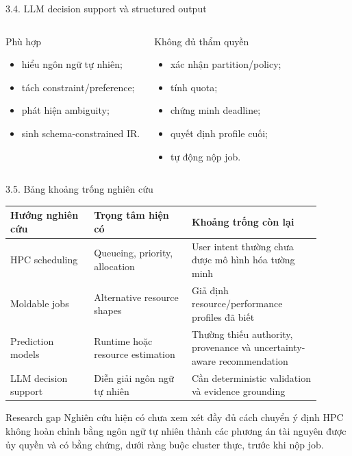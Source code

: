 \begin{frame}[t]{3.4. LLM decision support và structured output}
\small
\begin{columns}[T]
\begin{exampleblock}{Phù hợp}
\begin{itemize}
  \item hiểu ngôn ngữ tự nhiên;
  \item tách constraint/preference;
  \item phát hiện ambiguity;
  \item sinh schema-constrained IR.
\end{itemize}
\end{exampleblock}
\begin{alertblock}{Không đủ thẩm quyền}
\begin{itemize}
  \item xác nhận partition/policy;
  \item tính quota;
  \item chứng minh deadline;
  \item quyết định profile cuối;
  \item tự động nộp job.
\end{itemize}
\end{alertblock}
\end{columns}
\end{frame}

\begin{frame}[t,shrink=12]{3.5. Bảng khoảng trống nghiên cứu}
\scriptsize
\centering
\begin{tabular}{p{0.24\linewidth} p{0.29\linewidth} p{0.37\linewidth}}
\toprule
\textbf{Hướng nghiên cứu} & \textbf{Trọng tâm hiện có} & \textbf{Khoảng trống còn lại} \\
\midrule
HPC scheduling & Queueing, priority, allocation & User intent thường chưa được mô hình hóa tường minh \\
Moldable jobs & Alternative resource shapes & Giả định resource/performance profiles đã biết \\
Prediction models & Runtime hoặc resource estimation & Thường thiếu authority, provenance và uncertainty-aware recommendation \\
LLM decision support & Diễn giải ngôn ngữ tự nhiên & Cần deterministic validation và evidence grounding \\
\bottomrule
\end{tabular}
\vspace{0.25cm}
\begin{block}{Research gap}
Nghiên cứu hiện có chưa xem xét đầy đủ cách chuyển ý định HPC không hoàn chỉnh bằng ngôn ngữ tự nhiên thành các phương án tài nguyên được ủy quyền và có bằng chứng, dưới ràng buộc cluster thực, trước khi nộp job.
\end{block}
\end{frame}
